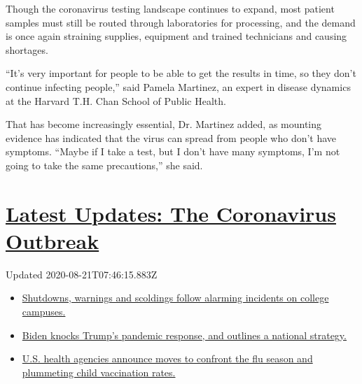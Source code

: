 Though the coronavirus testing landscape continues to expand, most
patient samples must still be routed through laboratories for
processing, and the demand is once again straining supplies, equipment
and trained technicians and causing shortages.

``It's very important for people to be able to get the results in time,
so they don't continue infecting people,'' said Pamela Martinez, an
expert in disease dynamics at the Harvard T.H. Chan School of Public
Health.

That has become increasingly essential, Dr. Martinez added, as mounting
evidence has indicated that the virus can spread from people who don't
have symptoms. ``Maybe if I take a test, but I don't have many symptoms,
I'm not going to take the same precautions,'' she said.

\hypertarget{latest-updates-the-coronavirus-outbreak}{%
\section{\texorpdfstring{\href{https://www.nytimes3xbfgragh.onion/2020/08/20/world/coronavirus-covid.html?action=click\&pgtype=Article\&state=default\&region=MAIN_CONTENT_1\&context=storylines_live_updates}{Latest
Updates: The Coronavirus
Outbreak}}{Latest Updates: The Coronavirus Outbreak}}\label{latest-updates-the-coronavirus-outbreak}}

Updated 2020-08-21T07:46:15.883Z

\begin{itemize}
\tightlist
\item
  \href{https://www.nytimes3xbfgragh.onion/2020/08/20/world/coronavirus-covid.html?action=click\&pgtype=Article\&state=default\&region=MAIN_CONTENT_1\&context=storylines_live_updates\#link-68774d88}{Shutdowns,
  warnings and scoldings follow alarming incidents on college campuses.}
\item
  \href{https://www.nytimes3xbfgragh.onion/2020/08/20/world/coronavirus-covid.html?action=click\&pgtype=Article\&state=default\&region=MAIN_CONTENT_1\&context=storylines_live_updates\#link-26b58724}{Biden
  knocks Trump's pandemic response, and outlines a national strategy.}
\item
  \href{https://www.nytimes3xbfgragh.onion/2020/08/20/world/coronavirus-covid.html?action=click\&pgtype=Article\&state=default\&region=MAIN_CONTENT_1\&context=storylines_live_updates\#link-4e542da3}{U.S.
  health agencies announce moves to confront the flu season and
  plummeting child vaccination rates.}
\end{itemize}

